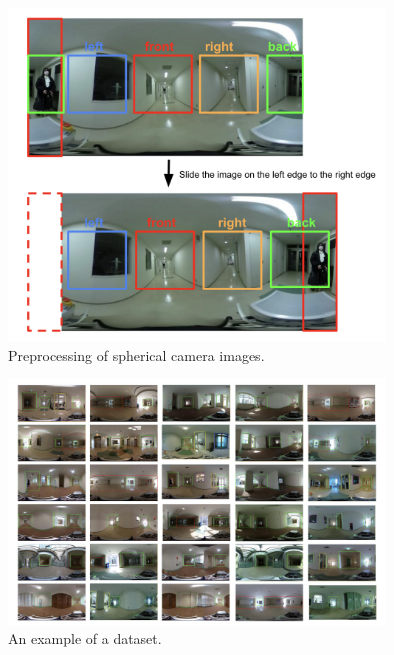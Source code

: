 \documentclass[../main]{subfiles}
\begin{document}
        \begin{figure}[H]
        \centering  
        \includegraphics[width=10cm]{../images/image_proc2.png}
        \caption{Preprocessing of spherical camera images.}
        \label{figure::image_proc_fig}
        \end{figure}

        \begin{figure}[H]
         \includegraphics[width=10cm]{../images/dataset_exp.png}
         \caption{An example of a dataset.}
         \label{figure::dataset_fig}
        \end{figure}
\end{document}

